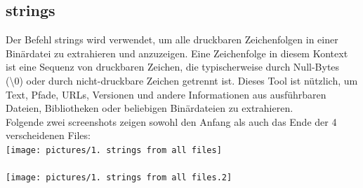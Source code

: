 \documentclass{article}
\begin{document}
	\subsection*{strings}
	Der Befehl strings wird verwendet, um alle druckbaren Zeichenfolgen in einer Binärdatei zu extrahieren und anzuzeigen. Eine Zeichenfolge in diesem Kontext ist eine Sequenz von druckbaren Zeichen, die typischerweise durch Null-Bytes (\textbackslash0) oder durch nicht-druckbare Zeichen getrennt ist. Dieses Tool ist nützlich, um Text, Pfade, URLs, Versionen und andere Informationen aus ausführbaren Dateien, Bibliotheken oder beliebigen Binärdateien zu extrahieren.\\
	Folgende zwei screenshots zeigen sowohl den Anfang als auch das Ende der 4 verscheidenen Files:\\
	\texttt{[image: pictures/1. strings from all files]}\\
	\\
	\texttt{[image: pictures/1. strings from all files.2]}\\
	
\end{document}
